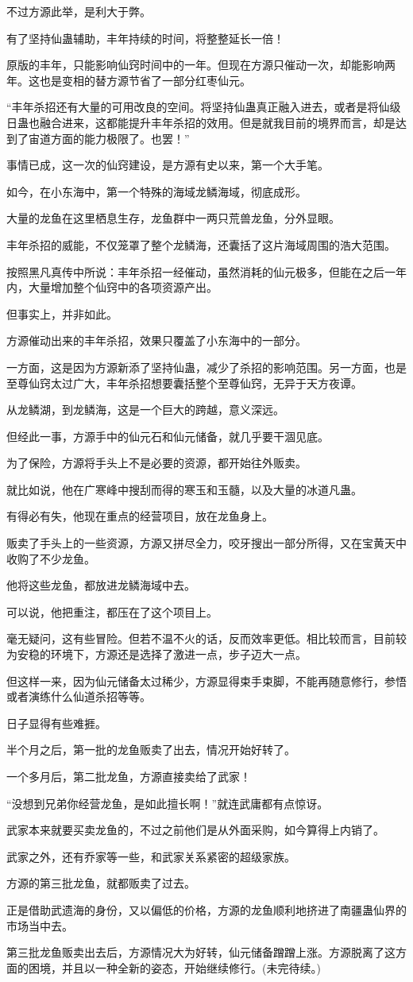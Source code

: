 \begin{this_body}
不过方源此举，是利大于弊。

有了坚持仙蛊辅助，丰年持续的时间，将整整延长一倍！

原版的丰年，只能影响仙窍时间中的一年。但现在方源只催动一次，却能影响两年。这也是变相的替方源节省了一部分红枣仙元。

“丰年杀招还有大量的可用改良的空间。将坚持仙蛊真正融入进去，或者是将仙级日蛊也融合进来，这都能提升丰年杀招的效用。但是就我目前的境界而言，却是达到了宙道方面的能力极限了。也罢！”

事情已成，这一次的仙窍建设，是方源有史以来，第一个大手笔。

如今，在小东海中，第一个特殊的海域龙鳞海域，彻底成形。

大量的龙鱼在这里栖息生存，龙鱼群中一两只荒兽龙鱼，分外显眼。

丰年杀招的威能，不仅笼罩了整个龙鳞海，还囊括了这片海域周围的浩大范围。

按照黑凡真传中所说：丰年杀招一经催动，虽然消耗的仙元极多，但能在之后一年内，大量增加整个仙窍中的各项资源产出。

但事实上，并非如此。

方源催动出来的丰年杀招，效果只覆盖了小东海中的一部分。

一方面，这是因为方源新添了坚持仙蛊，减少了杀招的影响范围。另一方面，也是至尊仙窍太过广大，丰年杀招想要囊括整个至尊仙窍，无异于天方夜谭。

从龙鳞湖，到龙鳞海，这是一个巨大的跨越，意义深远。

但经此一事，方源手中的仙元石和仙元储备，就几乎要干涸见底。

为了保险，方源将手头上不是必要的资源，都开始往外贩卖。

就比如说，他在广寒峰中搜刮而得的寒玉和玉髓，以及大量的冰道凡蛊。

有得必有失，他现在重点的经营项目，放在龙鱼身上。

贩卖了手头上的一些资源，方源又拼尽全力，咬牙搜出一部分所得，又在宝黄天中收购了不少龙鱼。

他将这些龙鱼，都放进龙鳞海域中去。

可以说，他把重注，都压在了这个项目上。

毫无疑问，这有些冒险。但若不温不火的话，反而效率更低。相比较而言，目前较为安稳的环境下，方源还是选择了激进一点，步子迈大一点。

但这样一来，因为仙元储备太过稀少，方源显得束手束脚，不能再随意修行，参悟或者演练什么仙道杀招等等。

日子显得有些难捱。

半个月之后，第一批的龙鱼贩卖了出去，情况开始好转了。

一个多月后，第二批龙鱼，方源直接卖给了武家！

“没想到兄弟你经营龙鱼，是如此擅长啊！”就连武庸都有点惊讶。

武家本来就要买卖龙鱼的，不过之前他们是从外面采购，如今算得上内销了。

武家之外，还有乔家等一些，和武家关系紧密的超级家族。

方源的第三批龙鱼，就都贩卖了过去。

正是借助武遗海的身份，又以偏低的价格，方源的龙鱼顺利地挤进了南疆蛊仙界的市场当中去。

第三批龙鱼贩卖出去后，方源情况大为好转，仙元储备蹭蹭上涨。方源脱离了这方面的困境，并且以一种全新的姿态，开始继续修行。(未完待续。)

\end{this_body}

